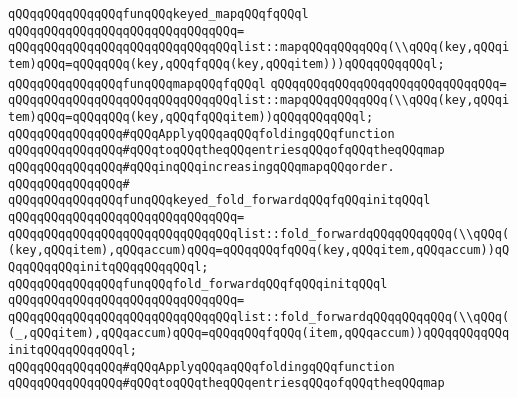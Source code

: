 \verb|qQQqqQQqqQQqqQQqfunqQQqkeyed_mapqQQqfqQQql|\newline
\verb|qQQqqQQqqQQqqQQqqQQqqQQqqQQqqQQq=|\newline
\verb|qQQqqQQqqQQqqQQqqQQqqQQqqQQqqQQqlist::mapqQQqqQQqqQQq(\\qQQq(key,qQQqitem)qQQq=qQQqqQQq(key,qQQqfqQQq(key,qQQqitem)))qQQqqQQqqQQql;|\newline
\newline
\verb|qQQqqQQqqQQqqQQqfunqQQqmapqQQqfqQQql|\newline
\verb|qQQqqQQqqQQqqQQqqQQqqQQqqQQqqQQq=|\newline
\verb|qQQqqQQqqQQqqQQqqQQqqQQqqQQqqQQqlist::mapqQQqqQQqqQQq(\\qQQq(key,qQQqitem)qQQq=qQQqqQQq(key,qQQqfqQQqitem))qQQqqQQqqQQql;|\newline
\newline
\newline
\verb|qQQqqQQqqQQqqQQq#qQQqApplyqQQqaqQQqfoldingqQQqfunction|\newline
\verb|qQQqqQQqqQQqqQQq#qQQqtoqQQqtheqQQqentriesqQQqofqQQqtheqQQqmap|\newline
\verb|qQQqqQQqqQQqqQQq#qQQqinqQQqincreasingqQQqmapqQQqorder.|\newline
\verb|qQQqqQQqqQQqqQQq#|\newline
\verb|qQQqqQQqqQQqqQQqfunqQQqkeyed_fold_forwardqQQqfqQQqinitqQQql|\newline
\verb|qQQqqQQqqQQqqQQqqQQqqQQqqQQqqQQq=|\newline
\verb|qQQqqQQqqQQqqQQqqQQqqQQqqQQqqQQqlist::fold_forwardqQQqqQQqqQQq(\\qQQq((key,qQQqitem),qQQqaccum)qQQq=qQQqqQQqfqQQq(key,qQQqitem,qQQqaccum))qQQqqQQqqQQqinitqQQqqQQqqQQql;|\newline
\newline
\verb|qQQqqQQqqQQqqQQqfunqQQqfold_forwardqQQqfqQQqinitqQQql|\newline
\verb|qQQqqQQqqQQqqQQqqQQqqQQqqQQqqQQq=|\newline
\verb|qQQqqQQqqQQqqQQqqQQqqQQqqQQqqQQqlist::fold_forwardqQQqqQQqqQQq(\\qQQq((_,qQQqitem),qQQqaccum)qQQq=qQQqqQQqfqQQq(item,qQQqaccum))qQQqqQQqqQQqinitqQQqqQQqqQQql;|\newline
\newline
\newline
\verb|qQQqqQQqqQQqqQQq#qQQqApplyqQQqaqQQqfoldingqQQqfunction|\newline
\verb|qQQqqQQqqQQqqQQq#qQQqtoqQQqtheqQQqentriesqQQqofqQQqtheqQQqmap|\newline
